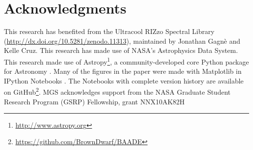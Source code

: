 \section{Acknowledgments}

This research has benefited from the Ultracool RIZzo Spectral Library (\url{http://dx.doi.org/10.5281/zenodo.11313}), maintained by Jonathan Gagn\`{e} and Kelle Cruz.  This research has made use of NASA's Astrophysics Data System.  This research made use of Astropy\footnote{\url{http://www.astropy.org}}, a community-developed core Python package for Astronomy \citep{2013A&A...558A..33A}.  Many of the figures in the paper were made with Matplotlib \citep{Hunter:2007} in IPython Notebooks \citep{PER-GRA:2007}.  The Notebooks with complete version history are available on GitHub\footnote{\url{https://github.com/BrownDwarf/BAADE}}.  MGS acknowledges support from the NASA Graduate Student Research Program (GSRP) Fellowship, grant NNX10AK82H


